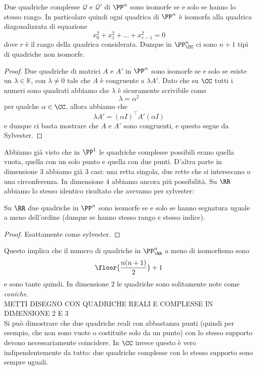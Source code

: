 \documentclass[11pt]{scrartcl}
\newcommand{\KK}{\mathbb{K}}
\begin{document}
	\begin{theorem}
		Due quadriche complesse $\mathcal{Q}$ e $\mathcal{Q}'$ di $\PP^n$ sono isomorfe se e solo se hanno lo stesso rango. In particolare quindi ogni quadrica di $\PP^n$ è isomorfa alla quadrica diagonalizzata di equazione
		$$x_0^2+x_1^2+\dots+x_{r-1}^2=0$$
		dove $r$ è il rango della quadrica considerata. Dunque in $\PP^n_\CC$ ci sono $n+1$ tipi di quadriche non isomorfe.
	\end{theorem}
	\begin{proof}
		Due quadriche di matrici $A$ e $A'$ in $\PP^n$ sono isomorfe se e solo se esiste un $\lambda\in \KK$, con $\lambda\ne 0$ tale che $A$ è congruente a $\lambda A'$. Dato che su $\CC$ tutti i numeri sono quadrati abbiamo che $\lambda$ è sicuramente scrivibile come 
		$$\lambda = \alpha^2$$
		per qualche $\alpha\in \CC$, allora abbiamo che
		$$\lambda A'=\left(\alpha I\right)^\intercal A'\left(\alpha I\right)$$
		e dunque ci basta mostrare che $A$ e $A'$ sono congruenti, e questo segue da Sylvester.
	\end{proof}
	Abbiamo già visto che in $\PP^1$ le quadriche complesse possibili erano quella vuota, quella con un solo punto e quella con due punti. D'altra parte in dimensione $3$ abbiamo già $3$ casi: una retta singola, due rette che si intersecano o una circonferenza. In dimensione $4$ abbiamo ancora più possibilità. Su $\RR$ abbiamo lo stesso identico risultato che avevamo per sylvester:
	\begin{theorem}
		Su $\RR$ due quadriche in $\PP^n$ sono isomorfe se e solo se hanno segnatura uguale a meno dell'ordine (dunque se hanno stesso rango e stesso indice).
	\end{theorem}
	\begin{proof}
		Esattamente come sylvester.
	\end{proof}
	Questo implica che il numero di quadriche in $\PP^n_\RR$ a meno di isomorfismo sono
	$$\floor{\frac{n(n+1)}{2}}+1$$
	e sono tante quindi. In dimensione $2$ le quadriche sono solitamente note come \textit{coniche}. \\
	METTI DISEGNO CON QUADRICHE REALI E COMPLESSE IN DIMENSIONE 2 E 3 \\
	Si può dimostrare che due quadriche reali con abbastanza punti (quindi per esempio, che non sono vuote o costituite solo da un punto) con lo stesso supporto devono necessariamente coincidere. In $\CC$ invece questo è vero indipendentemente da tutto: due quadriche complesse con lo stesso supporto sono sempre uguali.
\end{document}
